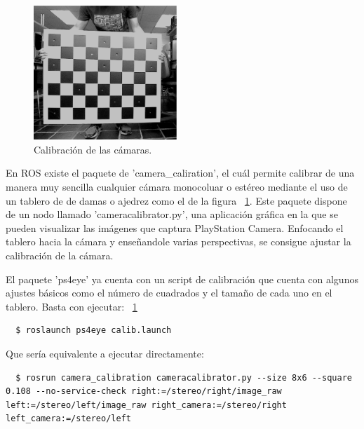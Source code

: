 \begin{figure}
  \vspace{-20pt}
  \begin{center}
    \includegraphics[width=0.48\textwidth]{images/cap4/Calibracion.eps}
  \end{center}
  \vspace{-20pt}
  \caption{Calibración de las cámaras.}
  \vspace{-10pt}
  \label{fig:Calibracion}
\end{figure}

En ROS existe el paquete de 'camera\_caliration', el cuál permite calibrar de
una manera muy sencilla cualquier cámara monocoluar o estéreo mediante el uso de
un tablero de de damas o ajedrez como el de la figura ~\ref{fig:Calibracion}.
Este paquete dispone de un nodo llamado 'cameracalibrator.py', una aplicación
gráfica en la que se pueden visualizar las imágenes que captura PlayStation
Camera. Enfocando el tablero hacia la cámara y enseñandole varias perspectivas,
se consigue ajustar la calibración de la cámara.

El paquete 'ps4eye' ya cuenta con un script de calibración que cuenta con
algunos ajustes básicos como el número de cuadrados y el tamaño de cada uno en
el tablero. Basta con ejecutar:
~\ref{fig:Calibracion} 
\\
\begin{lstlisting}
  $ roslaunch ps4eye calib.launch 
\end{lstlisting}

Que sería equivalente a ejecutar directamente:

\begin{lstlisting}
  $ rosrun camera_calibration cameracalibrator.py --size 8x6 --square 0.108 --no-service-check right:=/stereo/right/image_raw left:=/stereo/left/image_raw right_camera:=/stereo/right left_camera:=/stereo/left
\end{lstlisting}

